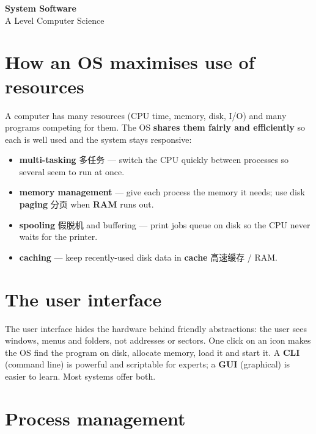 \documentclass[11pt]{article}
\begin{document}
\begin{center}
  {\LARGE\bfseries System Software}\\[0.35em]
  {\large A Level Computer Science}
\end{center}
\vspace{0.6em}

\section*{How an OS maximises use of resources}

A computer has many resources (CPU time, memory, disk, I/O) and many programs competing for them. The OS \textbf{shares them fairly and efficiently} so each is well used and the system stays responsive:

\begin{itemize}
\item \textbf{multi-tasking} 多任务 — switch the CPU quickly between processes so several seem to run at once.

\item \textbf{memory management} — give each process the memory it needs; use disk \textbf{paging} 分页 when \textbf{RAM} runs out.

\item \textbf{spooling} 假脱机 and buffering — print jobs queue on disk so the CPU never waits for the printer.

\item \textbf{caching} — keep recently-used disk data in \textbf{cache} 高速缓存 / RAM.

\end{itemize}

\section*{The user interface}

The user interface hides the hardware behind friendly abstractions: the user sees windows, menus and folders, not addresses or sectors. One click on an icon makes the OS find the program on disk, allocate memory, load it and start it. A \textbf{CLI} (command line) is powerful and scriptable for experts; a \textbf{GUI} (graphical) is easier to learn. Most systems offer both.

\section*{Process management}
\end{document}
